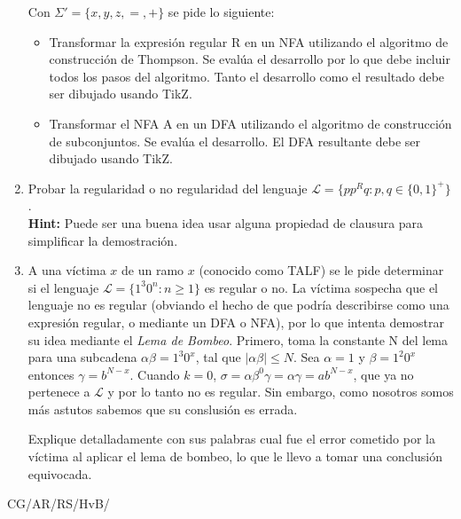 \documentclass{article}
\begin{document}
\begin{enumerate}
\begin{center}
\end{center}
Con $\Sigma'=\{x,y,z,=,+\}$ se pide lo siguiente:


\begin{itemize}
\item Transformar la expresión regular R en un NFA utilizando el algoritmo de construcción de Thompson. Se evalúa el desarrollo por lo que debe 
incluir todos los pasos del algoritmo. Tanto el desarrollo como el resultado debe ser dibujado usando TikZ. 
\item Transformar el NFA A en un DFA utilizando el algoritmo de construcción de subconjuntos. Se evalúa el desarrollo. El DFA resultante debe
ser dibujado usando TikZ.
\end{itemize}

\item Probar la regularidad o no regularidad del lenguaje \(\mathcal{L}= \big\{pp^{R}q \colon p,q \in \big\{0,1\big\}^{+}\big\} \).\\
\textbf{Hint:} Puede ser una buena idea usar alguna propiedad de clausura para simplificar la demostración. 

\item A una víctima \(x\) de un ramo \(x\) (conocido como TALF) se le pide determinar si el lenguaje \(\mathcal{L} = \big\{ 1^{3}0^{n} : n \geq 1 \big\} \) es regular o no. La víctima sospecha que el lenguaje no es regular (obviando el hecho de que podría describirse como una expresión regular, o mediante un DFA o NFA), por lo que intenta demostrar su idea mediante el \emph{Lema de Bombeo}. Primero, toma la constante N del lema  para una subcadena \(\alpha\beta = 1^{3}0^{x}\), tal que \(|\alpha\beta| \leq N\). Sea \(\alpha = 1\) y \(\beta = 1^{2}0^{x}\) entonces \(\gamma=b^{N-x}\). Cuando \(k = 0\), \(\sigma = \alpha\beta^0\gamma = \alpha\gamma = ab^{N-x}\), que ya no pertenece a \(\mathcal{L}\) y por lo tanto no es regular.
Sin embargo, como nosotros somos más astutos sabemos que su conslusión es errada.

Explique detalladamente con sus palabras cual fue el error cometido por la víctima al aplicar el lema de bombeo, lo que le llevo a tomar una conclusión equivocada.

\end{enumerate}
\newpage

  \vfill\hfill CG/AR/RS/HvB/\LaTeXe
\end{document}
